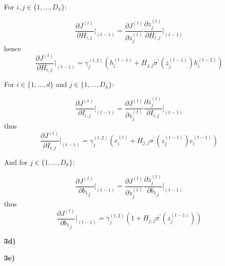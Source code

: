 \documentclass{article}
\begin{document}
For $i,j \in \{1, \dots, D_{h}\}$:


\begin{equation}\label{eq:46}
\frac{\partial J^{(t)}}{\partial H_{i,j}}\vert_{(t-1)} =\frac{\partial J^{(t)}}{\partial z^{(t)}_{j}}\frac{\partial  z^{(t)}_{j}}{\partial H_{i,j}}\vert_{(t-1)}  
\end{equation}
hence
\begin{equation}\label{eq:47}
\frac{\partial J^{(t)}}{\partial H_{i,j}}\vert_{(t-1)} =  \gamma^{(t,2)}_{j}(h^{(t-1)}_{i} + H_{j,j}\sigma^{\prime}(z^{(t-1)}_{j})h^{(t-2)}_{i})
\end{equation}



For $i \in \{1, \dots, d\}$ and $j \in \{1, \dots, D_{h}\}$:

\begin{equation}\label{eq:48}
\frac{\partial J^{(t)}}{\partial I_{i,j}}\vert_{(t-1)} =\frac{\partial J^{(t)}}{\partial z^{(t)}_{j}}\frac{\partial  z^{(t)}_{j}}{\partial I_{i,j}}\vert_{(t-1)}  
\end{equation}
thus
\begin{equation}\label{eq:49}
\frac{\partial J^{(t)}}{\partial I_{i,j}}\vert_{(t-1)} = \gamma^{(t,2)}_{j}(e^{(t)}_{i} + H_{j,j}\sigma^{\prime}(z^{(t-1)}_{j})e^{(t-1)}_{i})
\end{equation}

And for $j \in \{1, \dots, D_{h}\}$:

\begin{equation}\label{eq:50}
\frac{\partial J^{(t)}}{\partial {b_1}_{j}}\vert_{(t-1)} =\frac{\partial J^{(t)}}{\partial z^{(t)}_{j}}\frac{\partial  z^{(t)}_{j}}{\partial {b_1}_{j}}\vert_{(t-1)}  
\end{equation}
thus
\begin{equation}\label{eq:51}
\frac{\partial J^{(t)}}{\partial {b_1}_{j}}\vert_{(t-1)} = \gamma^{(t,2)}_{j}(1 + H_{j,j}\sigma^{\prime}(z^{(t-1)}_{j}))
\end{equation}

\textbf{3d)}

\textbf{3e)}
\end{document}
